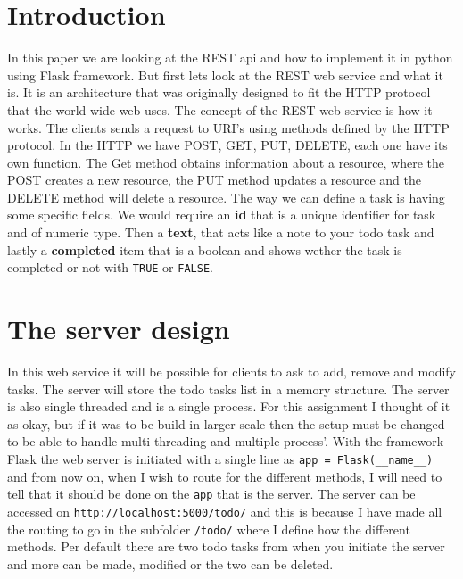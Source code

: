 \documentclass{sig-alternate-05-2015}
\begin{document}


%
%

%
%



\section{Introduction}
In this paper we are looking at the REST api and how to implement it in python using Flask framework. But first lets look at the REST web service and what it is. It is an architecture that was originally designed to fit the HTTP protocol that the world wide web uses. The concept of the REST web service is how it works. The clients sends a request to URI's using methods defined by the HTTP protocol.
In the HTTP we have POST, GET, PUT, DELETE, each one have its own function. The Get method obtains information about a resource, where the POST creates a new resource, the PUT method updates a resource and the DELETE method will delete a resource.
The way we can define a task is having some specific fields. We would require an \textbf{id} that is a unique identifier for task and of numeric type. Then a \textbf{text}, that acts like a note to your todo task and lastly a \textbf{completed} item that is a boolean and shows wether the task is completed or not with \texttt{TRUE} or \texttt{FALSE}.

\section{The server design}
In this web service it will be possible for clients to ask to add, remove and modify tasks. The server will store the todo tasks list in a  memory structure. The server is also single threaded and is a single process. For this assignment I thought of it as okay, but if it was to be build in larger scale then the setup must be changed to be able to handle multi threading and multiple process'.
With the framework Flask the web server is initiated with a single line as \texttt{app = Flask(\_\_name\_\_)} and from now on, when I wish to route for the different methods, I will need to tell that it should be done on the \texttt{app} that is the server.
The server can be accessed on \texttt{http://localhost:5000/todo/} and this is because I have made all the routing to go in the subfolder \texttt{/todo/} where I define how the different methods.
Per default there are two todo tasks from when you initiate the server and more can be made, modified or the two can be deleted.
\end{document}
